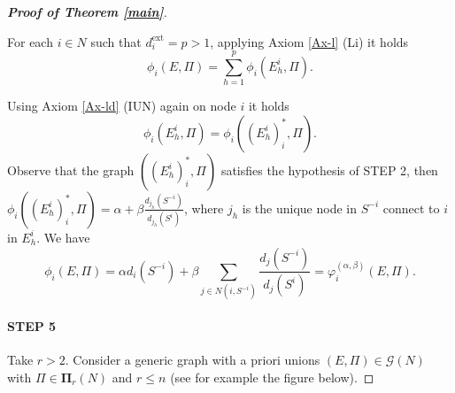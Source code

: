 \documentclass[preprint,11pt,authoryear]{elsarticle}
\theoremstyle{plain}
\begin{document}
\begin{proof}[\bf Proof of Theorem \ref{main}]
\begin{center}
	\end{center}
	
	For each $i\in N$ such that $d_i^{\text{ext}}=p>1$, applying Axiom \ref{Ax-l} (Li) it holds 
	$$
	\phi_i(E,\Pi) = \sum_{h=1}^p \phi_i(E_h^i,\Pi). 
	$$
	
	Using Axiom \ref{Ax-ld} (IUN) again on node $i$ it holds
	$$
	\phi_i(E_h^i,\Pi) = \phi_i((E_h^i)^*_i,\Pi). 
	$$
	Observe that the graph $((E_h^i)^*_i,\Pi)$ satisfies the hypothesis of STEP 2, then $\phi_i((E_h^i)^*_i,\Pi)=\alpha+\beta\frac{d_{j_h}(S^{-i})}{d_{j_h}(S^i)}$, where $j_h$ is the unique node in $S^{-i}$ connect to $i$ in $E_{h}^i$. We have
	$$
	\phi_i(E,\Pi) = \alpha d_i(S^{-i}) + \beta\sum_{j\in N(i,S^{-i})} \frac{d_j(S^{-i})}{d_j(S^i)} = \varphi_i^{(\alpha,\beta)}(E,\Pi). 
	$$
	
	\paragraph{STEP 5} Take $r>2$. Consider a generic graph with a priori unions $(E,\Pi)\in\mathcal{G}(N)$ with $\Pi\in\mathbf{\Pi}_{r}(N)$ and $r\leq n$ (see for example the figure below). 
	

\end{proof}
\end{document}
